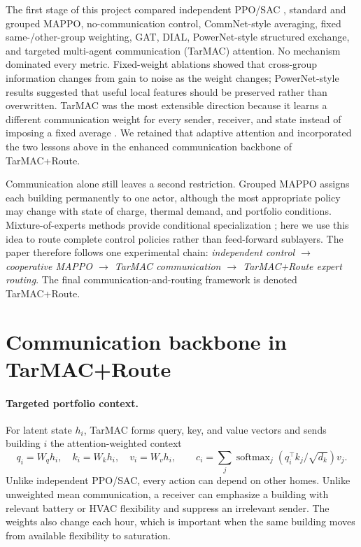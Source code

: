 \documentclass{article}
\begin{document}
The first stage of this project compared independent PPO/SAC
\citep{ppo2017,haarnoja2018sac}, standard and grouped MAPPO,
no-communication control, CommNet-style averaging, fixed
same-/other-group weighting, GAT, DIAL, PowerNet-style structured exchange, and
targeted multi-agent communication (TarMAC) attention. No mechanism dominated
every metric. Fixed-weight ablations
showed that cross-group information changes from gain to noise as the weight
changes; PowerNet-style results suggested that useful local features should be
preserved rather than overwritten. TarMAC was the most extensible direction
because it learns a different communication weight for every sender, receiver,
and state instead of imposing a fixed average \citep{tarmac2019}. We retained
that adaptive attention and incorporated the two lessons above in the enhanced
communication backbone of TarMAC+Route.


Communication alone still leaves a second restriction. Grouped MAPPO assigns
each building permanently to one actor, although the most appropriate policy
may change with state of charge, thermal demand, and portfolio conditions.
Mixture-of-experts methods provide conditional specialization
\citep{puigcerver2024softmoe,obandoceron2024moerl}; here we use this idea to
route complete control policies rather than feed-forward sublayers. The paper
therefore follows one experimental chain:
\emph{independent control $\rightarrow$ cooperative MAPPO $\rightarrow$
TarMAC communication $\rightarrow$ TarMAC+Route expert routing}.
The final communication-and-routing framework is denoted TarMAC+Route.


\section{Communication backbone in TarMAC+Route}


\paragraph{Targeted portfolio context.}
For latent state $h_i$, TarMAC forms query, key, and value vectors and sends
building $i$ the attention-weighted context
\begin{equation}
q_i=W_qh_i,\quad k_i=W_kh_i,\quad v_i=W_vh_i,\qquad
c_i=\sum_j
\operatorname{softmax}_j\!\left(q_i^\top k_j/\sqrt{d_k}\right)v_j .
\label{eq:tarmac}
\end{equation}
Unlike independent PPO/SAC, every action can depend on other homes. Unlike
unweighted mean communication, a receiver can emphasize a building with
relevant battery or HVAC flexibility and suppress an irrelevant sender. The
weights also change each hour, which is important when the same building moves
from available flexibility to saturation.
\end{document}
